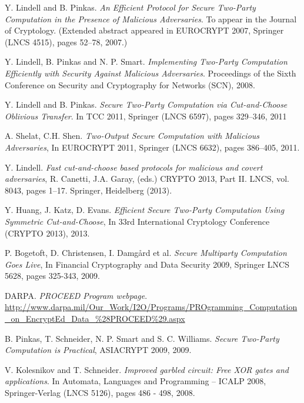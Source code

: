 \documentclass[ %
                    author={Nicholas Tutte},
                supervisor={Prof. Nigel Smart},
                    degree={MEng},
                     title={Secure Two Party Computation},
                  subtitle={A practical comparison of recent protocols},
                      type={Research - GG1K},
                      year={2015} ]{dissertation}
\begin{document}
		

	\begin{thebibliography}{99}

			Y. Lindell and B. Pinkas. \emph{An Efficient Protocol for Secure Two-Party Computation in the Presence of Malicious Adversaries}.
			To appear in the Journal of Cryptology. (Extended abstract appeared in EUROCRYPT 2007, Springer (LNCS 4515), pages 52–78, 2007.)

			Y. Lindell, B. Pinkas and N. P. Smart.
			\emph{Implementing Two-Party Computation Efficiently with Security Against Malicious Adversaries}. Proceedings of the Sixth Conference on Security and Cryptography for Networks (SCN),
			2008.

			Y. Lindell and B. Pinkas. \emph{Secure Two-Party Computation via Cut-and-Choose Oblivious Transfer}.
			In TCC 2011,
			Springer (LNCS 6597), pages 329–346,
			2011

			A. Shelat, C.H. Shen. \emph{Two-Output Secure Computation with Malicious Adversaries},
			In EUROCRYPT 2011,
			Springer (LNCS 6632), pages 386–405,
			2011.

			Y. Lindell.
			\emph{Fast cut-and-choose based protocols for malicious and covert adversaries}, R. Canetti, J.A. Garay, (eds.)
			CRYPTO 2013, Part II. LNCS, vol. 8043, pages 1–17.
			Springer, Heidelberg (2013).

			Y. Huang, J. Katz, D. Evans.
			\emph{Efficient Secure Two-Party Computation Using Symmetric Cut-and-Choose}, In 33rd International Cryptology Conference (CRYPTO 2013),
			2013.

			P. Bogetoft, D. Christensen, I. Damgård et al.
			\emph{Secure Multiparty Computation Goes Live},
			In Financial Cryptography and Data Security 2009,
			Springer LNCS 5628, pages 325-343,
			2009.

			DARPA.
			\emph{PROCEED Program webpage}.
			\url{http://www.darpa.mil/Our_Work/I2O/Programs/PROgramming_Computation_on_EncryptEd_Data_%28PROCEED%29.aspx}

			
			B. Pinkas, T. Schneider, N. P. Smart and S. C. Williams.
			\emph{Secure Two-Party Computation is Practical},
			ASIACRYPT 2009, 2009.

			V. Kolesnikov and T. Schneider.
			\emph{Improved garbled circuit: Free XOR gates and applications}.
			In Automata, Languages and Programming – ICALP 2008, Springer-Verlag (LNCS 5126),
			pages 486 - 498,
			2008.


\end{thebibliography}
\end{document}
